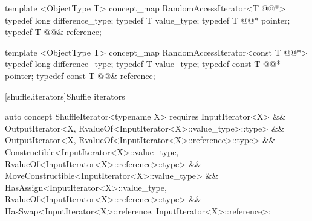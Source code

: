 \documentclass[american,twoside]{book}
\begin{document}
\pnum
{}

\color{addclr}
\begin{codeblock}
  template <ObjectType T> concept_map RandomAccessIterator<T @@*> {
    typedef long difference_type;
    typedef T value_type;
    typedef T @@* pointer;
    typedef T @@& reference;
  }

  template <ObjectType T> concept_map RandomAccessIterator<const T @@*> {
    typedef long difference_type;
    typedef T value_type;
    typedef const T @@* pointer;
    typedef const T @@& reference;
  }
\end{codeblock}
\textcolor{addclr}{\exitnote}
\color{black}

[shuffle.iterators]{Shuffle iterators}
\pnum
{}

\color{ccadd}
\begin{codeblock}
auto concept ShuffleIterator<typename X> {
  requires InputIterator<X>
        && OutputIterator<X, RvalueOf<InputIterator<X>::value_type>::type>
        && OutputIterator<X, RvalueOf<InputIterator<X>::reference>::type>
        && Constructible<InputIterator<X>::value_type, 
                         RvalueOf<InputIterator<X>::reference>::type>
        && MoveConstructible<InputIterator<X>::value_type>
        && HasAssign<InputIterator<X>::value_type, 
                     RvalueOf<InputIterator<X>::reference>::type>
        && HasSwap<InputIterator<X>::reference, InputIterator<X>::reference>;
}
\end{codeblock}
\color{black}

\pnum
{}

\pnum
{}
\end{document}
